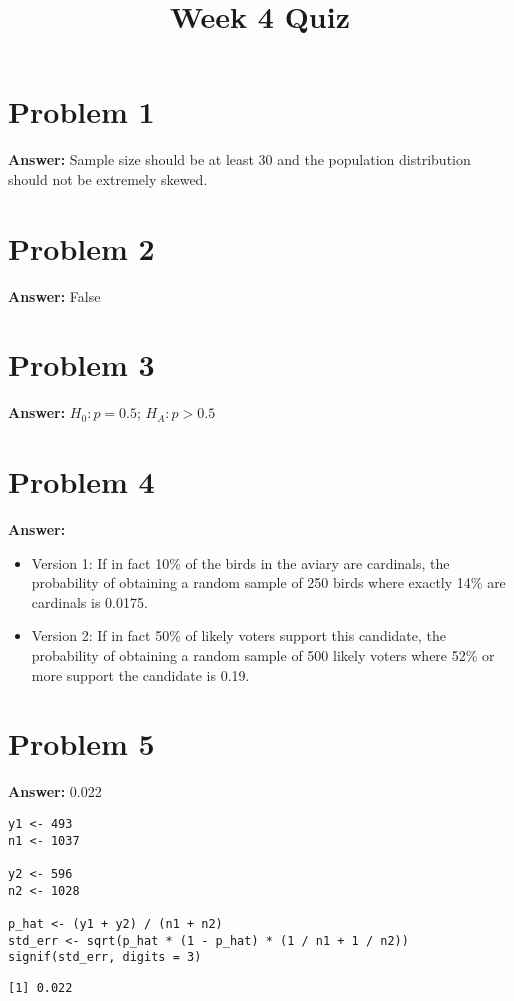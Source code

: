 \documentclass[11pt]{article}
\date{}
\title{Week 4 Quiz}
\begin{document}
\thispagestyle{empty}
\pagestyle{empty}
\section*{Problem 1}
\label{sec:orgd936b79}

\textbf{Answer:} Sample size should be at least 30 and the population distribution
should not be extremely skewed.
\section*{Problem 2}
\label{sec:org90b01e0}

\textbf{Answer:} False
\section*{Problem 3}
\label{sec:orgf6a41ed}

\textbf{Answer:} \(H_0:p=0.5\); \(H_A:p>0.5\)
\section*{Problem 4}
\label{sec:orgf5bbe4e}

\textbf{Answer:}
\begin{itemize}
\item Version 1: If in fact 10\% of the birds in the aviary are cardinals, the
probability of obtaining a random sample of 250 birds where exactly 14\% are
cardinals is 0.0175.
\item Version 2: If in fact 50\% of likely voters support this candidate, the
probability of obtaining a random sample of 500 likely voters where 52\% or
more support the candidate is 0.19.
\end{itemize}
\section*{Problem 5}
\label{sec:org04827ca}

\textbf{Answer:} 0.022

\begin{verbatim}
y1 <- 493
n1 <- 1037

y2 <- 596
n2 <- 1028

p_hat <- (y1 + y2) / (n1 + n2)
std_err <- sqrt(p_hat * (1 - p_hat) * (1 / n1 + 1 / n2))
signif(std_err, digits = 3)
\end{verbatim}

\label{}
\begin{verbatim}
[1] 0.022
\end{verbatim}
\end{document}
